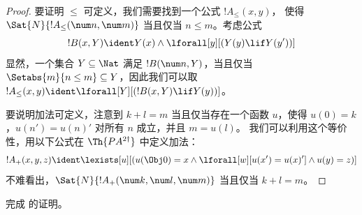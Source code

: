 \documentclass[../../../include/open-logic-section]{subfiles}
\begin{document}
\begin{proof}
要证明 $\le$ 可定义，我们需要找到一个公式 $!A_\le(x, y)$，
使得 $\Sat{N}{!A_\le(\num n, \num m)}$ 当且仅当 $n \le m$。考虑公式
\[
!B(x, Y) \ident Y(x) \land \lforall[y][(Y(y) \lif Y(y'))]
\]
显然，一个集合 $Y \subseteq \Nat$ 满足 $!B(\num n, Y)$，当且仅当
$\Setabs{m}{n \le m} \subseteq Y$，因此我们可以取 $!A_\le(x, y) \ident
\lforall[Y][(!B(x, Y) \lif Y(y))]$。

要说明加法可定义，注意到 $k+l=m$ 当且仅当存在一个函数 $u$，使得 $u(0)=k$，$u(n')=u(n)'$ 对所有 $n$ 成立，并且 $m = u(l)$。
我们可以利用这个等价性，用以下公式在 $\Th{PA^{2\dagger}}$ 中定义加法：
\[
!A_+(x,y,z) \ident \lexists[u][(u(\Obj 0)=x \land \lforall[w][u(x')=u
 (x)'] \land u(y)=z)]
\]
不难看出，$\Sat{N}{!A_+(\num k, \num l, \num m)}$
当且仅当 $k+l=m$。
\end{proof}

\begin{prob}
完成  的证明。
\end{prob}
\end{document}
